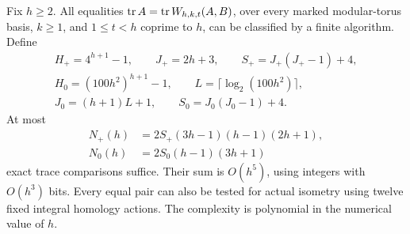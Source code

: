 \begin{theorem}\label{thm:finite-decision}
Fix $h\geqslant2$. All equalities
$\operatorname{tr} A=\operatorname{tr} W_{h,k,t}(A,B)$, over every marked modular-torus basis,
$k\geqslant1$, and $1\leqslant t<h$ coprime to $h$, can be classified
by a finite algorithm. Define
\begin{equation}\label{eq:decision-heights}
 \begin{gathered}
 H_+=4^{h+1}-1,\qquad J_+=2h+3,\qquad S_+=J_+(J_+-1)+4,\\
 H_0=(100h^2)^{h+1}-1,\qquad
 L=\lceil\log_2(100h^2)\rceil,\\
 J_0=(h+1)L+1,\qquad S_0=J_0(J_0-1)+4.
 \end{gathered}
\end{equation}
At most
\begin{equation}\label{eq:decision-count}
 \begin{split}
 N_+(h)&=2S_+(3h-1)(h-1)(2h+1),\\
 N_0(h)&=2S_0(h-1)(3h+1)
 \end{split}
\end{equation}
exact trace comparisons suffice. Their sum is $O(h^5)$, using integers
with $O(h^3)$ bits. Every equal pair can also be tested for actual
isometry using twelve fixed integral homology actions.
The complexity is polynomial in the numerical value of $h$.
\end{theorem}

